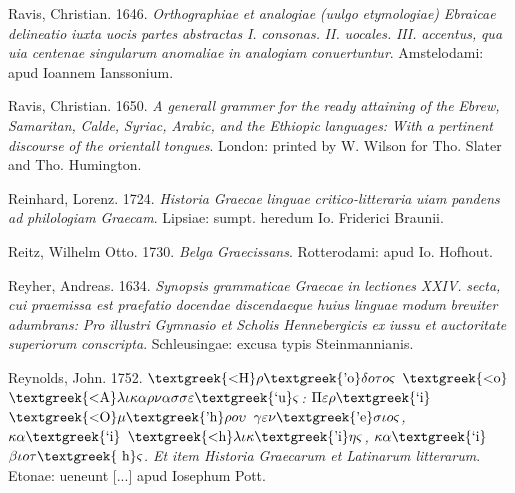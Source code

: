 \documentclass[output=paper]{langsci/langscibook}
\begin{document}
Ravis, Christian. 1646. \textit{Orthographiae} \textit{et} \textit{analogiae} \textit{(uulgo} \textit{etymologiae)} \textit{Ebraicae} \textit{delineatio} \textit{iuxta} \textit{uocis} \textit{partes} \textit{abstractas} \textit{I.} \textit{consonas.} \textit{II.} \textit{uocales.} \textit{III.} \textit{accentus,} \textit{qua} \textit{uia} \textit{centenae} \textit{singularum} \textit{anomaliae} \textit{in} \textit{analogiam} \textit{conuertuntur}. Amstelodami: apud Ioannem Ianssonium.

Ravis, Christian. 1650. \textit{A} \textit{generall} \textit{grammer} \textit{for} \textit{the} \textit{ready} \textit{attaining} \textit{of} \textit{the} \textit{Ebrew,} \textit{Samaritan,} \textit{Calde,} \textit{Syriac,} \textit{Arabic,} \textit{and} \textit{the} \textit{Ethiopic} \textit{languages:} \textit{With} \textit{a} \textit{pertinent} \textit{discourse} \textit{of} \textit{the} \textit{orientall} \textit{tongues}. London: printed by W. Wilson for Tho. Slater and Tho. Humington.

Reinhard, Lorenz. 1724. \textit{Historia} \textit{Graecae} \textit{linguae} \textit{critico-litteraria} \textit{uiam} \textit{pandens} \textit{ad} \textit{philologiam} \textit{Graecam}. Lipsiae: sumpt. heredum Io. Friderici Braunii.

Reitz, Wilhelm Otto. 1730. \textit{Belga} \textit{Graecissans}. Rotterodami: apud Io. Hofhout.

Reyher, Andreas. 1634. \textit{Synopsis} \textit{grammaticae} \textit{Graecae} \textit{in} \textit{lectiones} \textit{XXIV.} \textit{secta,} \textit{cui} \textit{praemissa} \textit{est} \textit{praefatio} \textit{docendae} \textit{discendaeque} \textit{huius} \textit{linguae} \textit{modum} \textit{breuiter} \textit{adumbrans:} \textit{Pro} \textit{illustri} \textit{Gymnasio} \textit{et} \textit{Scholis} \textit{Hennebergicis} \textit{ex} \textit{iussu} \textit{et} \textit{auctoritate} \textit{superiorum} \textit{conscripta}. Schleusingae: excusa typis Steinmannianis.

Reynolds, John. 1752. \textit{$\text{\textgreek{<H}}\rho \text{\textgreek{'o}}\delta o\tau o\varsigma $ $\text{\textgreek{<o}}$ $\text{\textgreek{<A}}\lambda \iota \kappa \alpha \rho \nu \alpha \sigma \sigma \varepsilon \text{\textgreek{`u}}\varsigma $: $\Pi \varepsilon \rho \text{\textgreek{`i}}$ $\text{\textgreek{<O}}\mu \text{\textgreek{'h}}\rho o\upsilon $ $\gamma \varepsilon \nu \text{\textgreek{'e}}\sigma \iota o\varsigma $, $\kappa \alpha \text{\textgreek{`i}}$ $\text{\textgreek{<h}}\lambda \iota \kappa \text{\textgreek{'i}}\eta \varsigma $, $\kappa \alpha \text{\textgreek{`i}}$ $\beta \iota o\tau \text{\textgreek{~h}}\varsigma $. Et item Historia Graecarum et Latinarum litterarum}. Etonae: ueneunt [...] apud Iosephum Pott.
\end{document}
